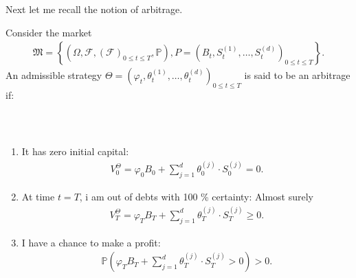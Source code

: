 \documentclass{beamer}
\numberwithin{equation}{section}
\begin{document}
\begin{frame}\frametitle{{\normalsize \secname} \\ {\large \subsecname}}
    Next let me recall the notion of arbitrage.
    \begin{definition}[Arbitrage]
        Consider the market
        \begingroup
        \footnotesize
        \begin{align}
            \mathfrak{M} =
            \left\{
                \left(
                    \Omega, 
                    \mathscr{F}, 
                    \left(
                        \mathscr{F}
                    \right)_{0 \leq t \leq T},
                    \mathbb{P}
                \right),
                P =
                \left(
                    B_t,
                    S_t^{(1)},
                    \ldots,
                    S_t^{(d)}
                \right)_{0 \leq t \leq T}
            \right\}.
        \end{align}
        \endgroup
        An admissible strategy $\Theta = \left(\varphi_t, \theta_t^{(1)}, \ldots, \theta_t^{(d)}\right)_{0 \leq t \leq T}$ is said to be an arbitrage if:
    \end{definition}
\end{frame}

\begin{frame}\frametitle{{\normalsize \secname} \\ {\large \subsecname}}
    \begin{enumerate}
        \item It has zero initial capital:
        \begin{align}
            V_0^\Theta = \varphi_0B_0 + \sum_{j = 1}^d\theta_0^{(j)} \cdot S_0^{(j)} = 0.
        \end{align}
        \item At time $t = T$, i am out of debts with 100 \% certainty: Almost surely
        \begin{align}
            V_T^\Theta = \varphi_T B_T + \sum_{j = 1}^d\theta_T^{(j)} \cdot S_T^{(j)} \geq 0.
        \end{align}
        \item I have a chance to make a profit:
        \begin{align}
            \mathbb{P}
            \left(
                \varphi_TB_T + \sum_{j = 1}^d \theta_T^{(j)} \cdot S_T^{(j)} > 0
            \right) > 0.
        \end{align}
    \end{enumerate}
\end{frame}
\end{document}
